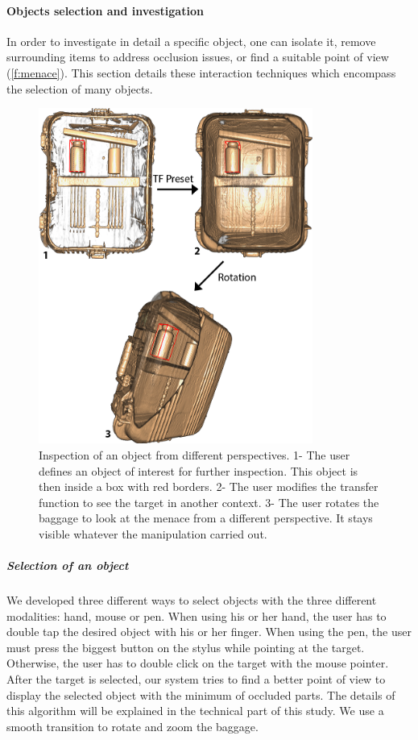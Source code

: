 \paragraph{ Objects selection and investigation}
In order to investigate in detail a specific object, one can isolate it, remove surrounding items to address occlusion issues, or find a suitable point of view (\autoref{f:menace}). This section details these interaction techniques which encompass the selection of  many objects.
\begin{figure}
\centering   
\includegraphics[width=9cm]{Figures/menace.png}
\caption{ Inspection of an object from different perspectives. 1- The user defines an object of interest for further inspection. This object is then inside a box with red borders. 2-  The user modifies the transfer function to see the target in another context. 3- The user rotates the baggage to look at the menace from a different perspective. It stays visible whatever the manipulation carried out.  }
\label{f:menace}
\end{figure} 

\subparagraph{	Selection of an object}
We developed three different ways to select objects with the three different modalities: hand, mouse or pen. When using his or her hand, the user has to double tap the desired object with his or her finger. When using the pen, the user must press the biggest button on the stylus while pointing at the target. Otherwise, the user has to double click on the target with the mouse pointer. After the target is selected, our system tries to find a better point of view to display the selected object with the minimum of occluded parts. The details of this algorithm will be explained in the technical part of this study. We use a smooth transition to rotate and zoom the baggage. 


